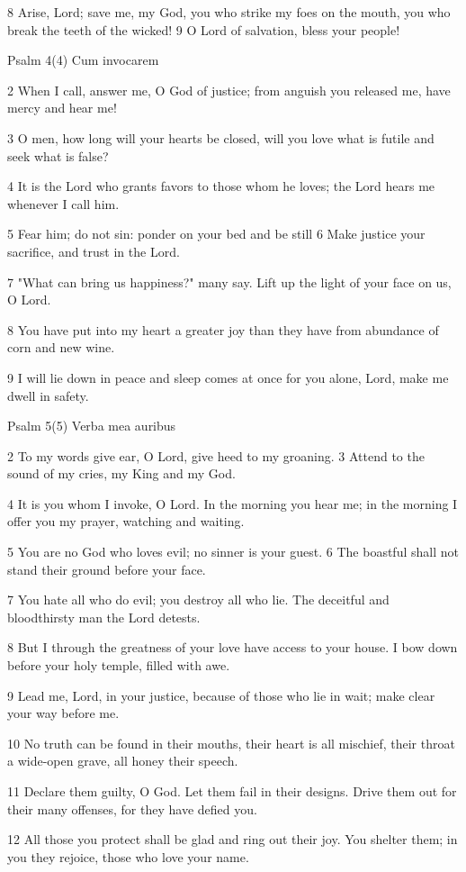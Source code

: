 8 Arise, Lord; save me, my God,
you who strike my foes on the mouth,
you who break the teeth of the wicked!
9 O Lord of salvation, bless your people!


Psalm 4(4) Cum invocarem

2 When I call, answer me, O God of justice;
from anguish you released me, have mercy and hear me!

3 O men, how long will your hearts be closed,
will you love what is futile and seek what is false?

4 It is the Lord who grants favors to those whom he loves;
the Lord hears me whenever I call him.

5 Fear him; do not sin: ponder on your bed and be still
6 Make justice your sacrifice, and trust in the Lord.

7 "What can bring us happiness?" many say.
Lift up the light of your face on us, O Lord.

8 You have put into my heart a greater joy
than they have from abundance of corn and new wine.

9 I will lie down in peace and sleep comes at once
for you alone, Lord, make me dwell in safety.


Psalm 5(5) Verba mea auribus

2 To my words give ear, O Lord,
give heed to my groaning.
3 Attend to the sound of my cries,
my King and my God.

4 It is you whom I invoke, O Lord.
In the morning you hear me;
in the morning I offer you my prayer,
watching and waiting.

5 You are no God who loves evil;
no sinner is your guest.
6 The boastful shall not stand their ground
before your face.

7 You hate all who do evil;
you destroy all who lie.
The deceitful and bloodthirsty man
the Lord detests.

8 But I through the greatness of your love
have access to your house.
I bow down before your holy temple,
filled with awe.

9 Lead me, Lord, in your justice,
because of those who lie in wait;
make clear your way before me.

10 No truth can be found in their mouths,
their heart is all mischief,
their throat a wide-open grave,
all honey their speech.

11 Declare them guilty, O God.
Let them fail in their designs.
Drive them out for their many offenses,
for they have defied you.

12 All those you protect shall be glad
and ring out their joy.
You shelter them; in you they rejoice,
those who love your name.

